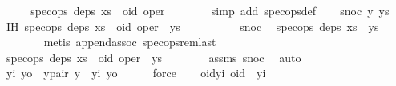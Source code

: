 \begin{isabellebody}
\ \ \isamarkupfalse%
\ \isamarkupfalse%
\ {\isachardoublequoteopen}spec{\isacharunderscore}ops\ deps\ {\isacharparenleft}xs\ {\isacharat}\ {\isacharbrackleft}{\isacharparenleft}oid{\isacharcomma}\ oper{\isacharparenright}{\isacharbrackright}\ {\isacharat}\ {\isacharbrackleft}{\isacharbrackright}{\isacharparenright}{\isachardoublequoteclose}\isanewline
\ \ \ \ \isamarkupfalse%
\ {\isacharparenleft}simp\ add{\isacharcolon}\ spec{\isacharunderscore}ops{\isacharunderscore}def{\isacharparenright}\isanewline
{}\isamarkupfalse%
\isanewline
\ \ \isamarkupfalse%
\ {\isacharparenleft}snoc\ y\ ys{\isacharparenright}\isanewline
\ \ \isamarkupfalse%
\ IH{\isacharcolon}\ {\isachardoublequoteopen}spec{\isacharunderscore}ops\ deps\ {\isacharparenleft}xs\ {\isacharat}\ {\isacharbrackleft}{\isacharparenleft}oid{\isacharcomma}\ oper{\isacharparenright}{\isacharbrackright}\ {\isacharat}\ ys{\isacharparenright}{\isachardoublequoteclose}\isanewline
\ \ \isamarkupfalse%
\ {\isacharminus}\isanewline
\ \ \ \ \isamarkupfalse%
\ snoc\ \isamarkupfalse%
\ {\isachardoublequoteopen}spec{\isacharunderscore}ops\ deps\ {\isacharparenleft}xs\ {\isacharat}\ ys{\isacharparenright}{\isachardoublequoteclose}\isanewline
\ \ \ \ \ \ \isamarkupfalse%
\ {\isacharparenleft}metis\ append{\isacharunderscore}assoc\ spec{\isacharunderscore}ops{\isacharunderscore}rem{\isacharunderscore}last{\isacharparenright}\isanewline
\ \ \ \ \isamarkupfalse%
\ {\isachardoublequoteopen}spec{\isacharunderscore}ops\ deps\ {\isacharparenleft}xs\ {\isacharat}\ {\isacharbrackleft}{\isacharparenleft}oid{\isacharcomma}\ oper{\isacharparenright}{\isacharbrackright}\ {\isacharat}\ ys{\isacharparenright}{\isachardoublequoteclose}\isanewline
\ \ \ \ \ \ \isamarkupfalse%
\ assms{\isacharparenleft}{}{\isacharparenright}\ snoc\ \isamarkupfalse%
\ auto\isanewline
\ \ \isamarkupfalse%
\isanewline
\ \ \isamarkupfalse%
\ yi\ yo\ \ y{\isacharunderscore}pair{\isacharcolon}\ {\isachardoublequoteopen}y\ {\isacharequal}\ {\isacharparenleft}yi{\isacharcomma}\ yo{\isacharparenright}{\isachardoublequoteclose}\isanewline
\ \ \ \ \isamarkupfalse%
\ force\isanewline
\ \ \isamarkupfalse%
\ oid{\isacharunderscore}yi{\isacharcolon}\ {\isachardoublequoteopen}oid\ {\isacharless}\ yi{\isachardoublequoteclose}\isanewline
\ \ \ \ \isamarkupfalse%

\end{isabellebody}
